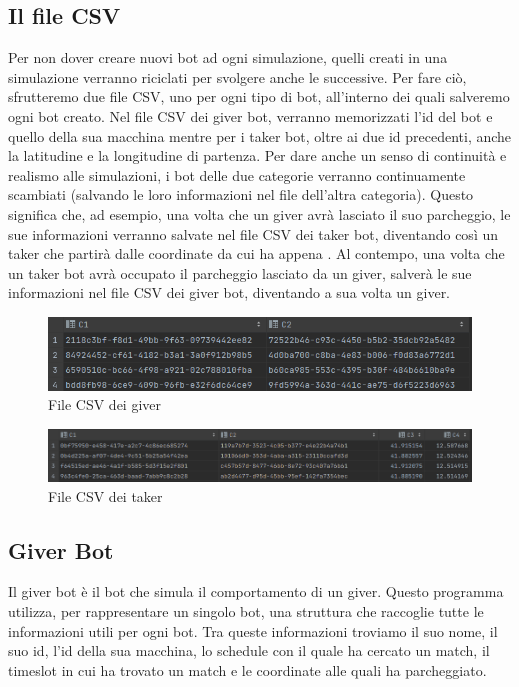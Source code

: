 \documentclass[main.tex]{subfiles}
\begin{document}
\subsection{Il file CSV}
Per non dover creare nuovi bot ad ogni simulazione, quelli creati in una simulazione verranno riciclati per svolgere anche le successive. Per fare ciò, sfrutteremo due file CSV, uno per ogni tipo di bot, all'interno dei quali salveremo ogni bot creato.\newline
Nel file CSV dei giver bot, verranno memorizzati l'id del bot e quello della sua macchina mentre per i taker bot, oltre ai due id precedenti, anche la latitudine e la longitudine di partenza. \newline
Per dare anche un senso di continuità e realismo alle simulazioni, i bot delle due categorie verranno continuamente scambiati (salvando le loro informazioni nel file dell'altra categoria). Questo significa che, ad esempio, una volta che un giver avrà lasciato il suo parcheggio, le sue informazioni verranno salvate nel file CSV dei taker bot, diventando così un taker che partirà dalle coordinate da cui ha appena . Al contempo, una volta che un taker bot avrà occupato il parcheggio lasciato da un giver, salverà le sue informazioni nel file CSV dei giver bot, diventando a sua volta un giver.

\begin{figure}[H]
    \centering
    \includegraphics[width=1\linewidth]{img/simulazione/giverbot/giver-CSV.png}
    \caption{File CSV dei giver}
    \label{fig:giverbot csv}
\end{figure}
\begin{figure}[H]
    \centering
    \includegraphics[width=1\linewidth]{img/simulazione/takerbot/taker-CSV.png}
    \caption{File CSV dei taker}
    \label{fig:takerbot csv}
\end{figure}

\subsection{Giver Bot}
Il giver bot è il bot che simula il comportamento di un giver. Questo programma utilizza, per rappresentare un singolo bot, una struttura che raccoglie tutte le informazioni utili per ogni bot. Tra queste informazioni troviamo il suo nome, il suo id, l'id della sua macchina, lo schedule con il quale ha cercato un match, il timeslot in cui ha trovato un match e le coordinate alle quali ha parcheggiato.
\end{document}
